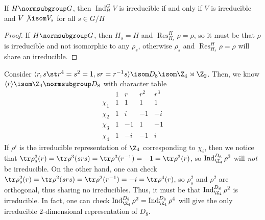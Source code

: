 \documentclass[11pt,leqno,oneside]{amsbook}
\newcommand{\Res}{\operatorname{Res}}
\newcommand{\Ind}{\operatorname{Ind}}
\numberwithin{thm}{section}
\begin{document}
\begin{cor}
  If \(H \normsubgroup G\), then \(\Ind_H^G V\) is irreducible if and
  only if \(V\) is irreducible and \(V \not \isom V_s\) for all \(s \in G/H\)
\end{cor}
\begin{proof}
  If \(H \normsubgroup G\), then \(H_s = H\) and \(\Res_{H_s}^H \rho =
  \rho\), so it must be that \(\rho\) is irreducible and not
  isomorphic to any \(\rho_s\), otherwise \(\rho_s\) and
  \(\Res_{H_s}^H \rho = \rho\) will share an irreducible.
\end{proof}
\begin{example}
  Consider \(\langle r,s \st r^4 = s^2 = 1, sr = r^{-1}s \rangle \isom
  D_8 \isom \Z_4 \rtimes \Z_2\). Then, we know \(\langle r \rangle
  \isom \Z_4
  \normsubgroup D_8\) with character table \[
    \begin{array}{c|cccc}
      &1&r&r^2&r^3 \\
      \hline
      \chi_1 & 1 & 1 & 1 & 1 \\
      \chi_2 & 1 & i & -1 & -i\\
      \chi_3 & 1 & -1 & 1 & -1 \\
      \chi_4 & 1 & -i & -1 & i
    \end{array}
  \]
  If \(\rho^i\) is the irreducible representation of \(\Z_4\)
  corresponding to \(\chi_i\), then we notice that \(\tr \rho^3_s(r) =
  \tr \rho^3(srs) = \tr \rho^3(r^{-1}) = -1 = \tr \rho^3(r)\), so
  \(\Ind_{\Z_4}^{D_8} 
  \rho^3\) will \emph{not} be irreducible. On the other hand, one can
  check \(\tr \rho^2_s(r) = \tr \rho^2(srs) = \tr \rho^2(r^{-1}) = -i
  = \tr \rho^4(r)\), so
  \(\rho^2_s\) and \(\rho^2\) are orthogonal, thus sharing no
  irreducibles. Thus, it must be that \(\Ind_{\Z_4}^{D_8} \rho^2\) is
  irreducible. In fact, one can check \(\Ind_{\Z_4}^{D_8} \rho^2 =
  \Ind_{\Z_4}^{D_8} \rho^4\) will give the only irreducible
  \(2\)-dimensional representation of \(D_8\).
\end{example}
\end{document}
